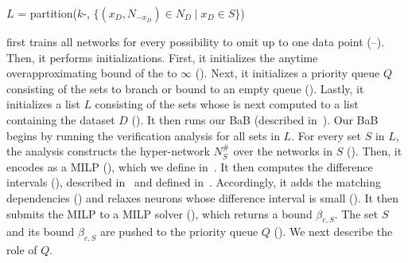 \begin{algorithm}[t]
{    $L$ = partition($k$-, $\{(x_D,N_{-x_D})\in N_{D} \mid x_D  \in S\}$)\; \label{algbab_ln:kmeans}
   
  }
 \label{ln:ret}
\end{algorithm}


\boundtool first trains all networks for every possibility to omit up to one data point (--). %
Then, it performs initializations. First, it initializes the anytime overapproximating bound of the \propa to $\infty$ (). 
Next, it initializes a priority queue $Q$ consisting of the sets to branch or bound to an empty queue (). 
Lastly, it initializes a list $L$ consisting of the sets whose \propa is next computed to a list containing the dataset $D$ ().
It then runs our BaB (described in~). 
Our BaB begins by running the verification analysis for all sets in $L$. 
For every set $S$ in $L$, the analysis constructs the hyper-network $N^\#_{S}$ over the networks in $S$ (). 
Then, it encodes  as a MILP (), which we define in~. 
It then computes the difference intervals (), described in~ and defined in~. 
Accordingly, it adds the matching dependencies () and relaxes neurons whose difference interval is small (). %
It then submits the MILP to a MILP solver (), which returns a bound $\beta_{c,S}$. 
The set $S$ and its bound $\beta_{c,S}$ are pushed to the priority queue $Q$ (). 
We next describe the role of $Q$. 


